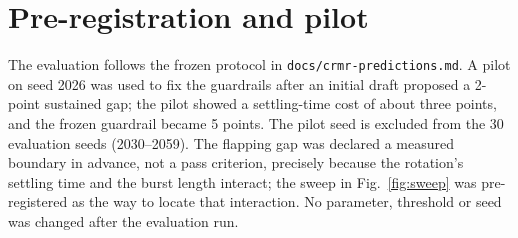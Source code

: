 \documentclass[10pt,a4paper]{article}
\begin{document}
\appendix
\section{Pre-registration and pilot}
The evaluation follows the frozen protocol in \texttt{docs/crmr-predictions.md}.
A pilot on seed 2026 was used to fix the guardrails after an initial draft
proposed a 2-point sustained gap; the pilot showed a settling-time cost of about
three points, and the frozen guardrail became 5 points. The pilot seed is
excluded from the 30 evaluation seeds (2030--2059). The flapping gap was declared
a measured boundary in advance, not a pass criterion, precisely because the
rotation's settling time and the burst length interact; the sweep in
Fig.~\ref{fig:sweep} was pre-registered as the way to locate that interaction. No
parameter, threshold or seed was changed after the evaluation run.
\end{document}
